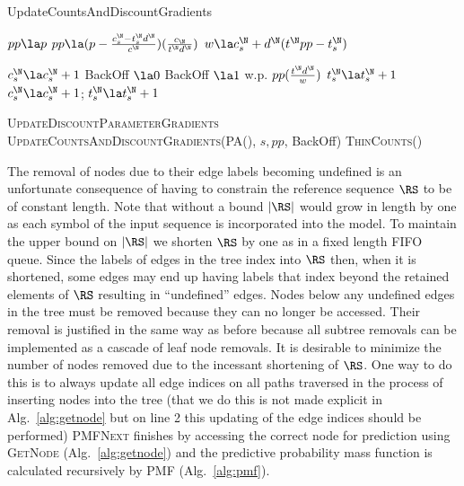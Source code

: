 \begin{algorithm}[t!]
	\caption{UpdateCountsAndDiscountGradients} \label{alg:updatecountsandgradients}
	\begin{algorithmic}[1]
	
		\State $pp \la p$
			\State $pp \la (p - \frac{c^\N_s - t^\N_s d^{\N}}{c^\N})(\frac{c_\N}{t^\N d^{\N}})$
			\State $w \la c^\N_s	+ d^\N (t^\N pp   - t^\N_s)$		
		\EndIf
		
			\State $c^\N_s \la c^\N_s + 1$
			\State BackOff $\la 0$
			\State BackOff $\la 1$ w.p. $pp (\frac{t^\N d^{\N}}{w})$ 
				\State $t^\N_s \la t^\N_s + 1$
			 \EndIf
				\State $c^\N_s \la c^\N_s + 1$;  $t^\N_s \la t^\N_s + 1$
		\EndIf
		
		\State \textsc{UpdateDiscountParameterGradients}%
		\State \textsc{UpdateCountsAndDiscountGradients}(\textsc{PA}(\N), $s,pp$, BackOff)
		\State \textsc{ThinCounts}(\N)
	\EndFunction
		\end{algorithmic}
\end{algorithm}


The removal of nodes due to their edge labels becoming undefined is an unfortunate consequence of having to constrain the reference sequence $\RS$ to be of constant length.  Note that without a bound $|\RS|$ would grow in length by one as each symbol of the input sequence is incorporated into the model.  To maintain the upper bound on $|\RS|$ we shorten $\RS$ by one as in a fixed length FIFO queue. Since the labels of edges in the tree index into $\RS$ then, when it is shortened, some edges may end up having labels that index beyond the retained elements of $\RS$ resulting in ``undefined'' edges.  Nodes below any undefined edges in the tree must be removed because they can no longer be accessed.  Their removal is justified in the same way as before because all subtree removals can be implemented as a cascade of leaf node removals.  It is desirable to minimize the number of nodes removed due to the incessant shortening of $\RS$.  One way to do this is to always update all edge indices on all paths traversed in the process of inserting nodes into the tree (that we do this is not made explicit in Alg.~\ref{alg:getnode} but on line 2 this updating of the edge indices should be performed)   \textsc{PMFNext} finishes by accessing the correct node for prediction using \textsc{GetNode} (Alg.~\ref{alg:getnode}) and the predictive probability mass function is calculated recursively by \textsc{PMF} (Alg.~\ref{alg:pmf}).

